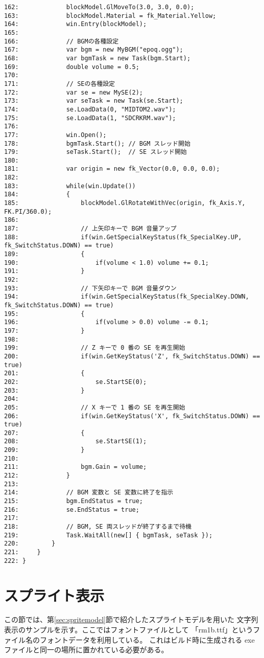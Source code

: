 \begin{breakbox}
\begin{small}
\begin{verbatim}
162:             blockModel.GlMoveTo(3.0, 3.0, 0.0);
163:             blockModel.Material = fk_Material.Yellow;
164:             win.Entry(blockModel);
165: 
166:             // BGMの各種設定
167:             var bgm = new MyBGM("epoq.ogg");
168:             var bgmTask = new Task(bgm.Start);
169:             double volume = 0.5;
170:             
171:             // SEの各種設定
172:             var se = new MySE(2);
173:             var seTask = new Task(se.Start);
174:             se.LoadData(0, "MIDTOM2.wav");
175:             se.LoadData(1, "SDCRKRM.wav");
176: 
177:             win.Open();
178:             bgmTask.Start(); // BGM スレッド開始
179:             seTask.Start();  // SE スレッド開始
180: 
181:             var origin = new fk_Vector(0.0, 0.0, 0.0);
182: 
183:             while(win.Update())
184:             {
185:                 blockModel.GlRotateWithVec(origin, fk_Axis.Y, FK.PI/360.0);
186: 
187:                 // 上矢印キーで BGM 音量アップ
188:                 if(win.GetSpecialKeyStatus(fk_SpecialKey.UP, fk_SwitchStatus.DOWN) == true)
189:                 {
190:                     if(volume < 1.0) volume += 0.1;
191:                 }
192: 
193:                 // 下矢印キーで BGM 音量ダウン
194:                 if(win.GetSpecialKeyStatus(fk_SpecialKey.DOWN, fk_SwitchStatus.DOWN) == true)
195:                 {
196:                     if(volume > 0.0) volume -= 0.1;
197:                 }
198: 
199:                 // Z キーで 0 番の SE を再生開始
200:                 if(win.GetKeyStatus('Z', fk_SwitchStatus.DOWN) == true)
201:                 {
202:                     se.StartSE(0);
203:                 }
204: 
205:                 // X キーで 1 番の SE を再生開始
206:                 if(win.GetKeyStatus('X', fk_SwitchStatus.DOWN) == true)
207:                 {
208:                     se.StartSE(1);
209:                 }
210: 
211:                 bgm.Gain = volume;
212:             }
213: 
214:             // BGM 変数と SE 変数に終了を指示
215:             bgm.EndStatus = true;
216:             se.EndStatus = true;
217: 
218:             // BGM, SE 両スレッドが終了するまで待機
219:             Task.WaitAll(new[] { bgmTask, seTask });
220:         }
221:     }
222: }
\end{verbatim}
\end{small}
\end{breakbox}

\section{スプライト表示}
この節では、第\ref{sec:spritemodel}節で紹介したスプライトモデルを用いた
文字列表示のサンプルを示す。ここではフォントファイルとして
「rm1b.ttf」というファイル名のフォントデータを利用している。
これはビルド時に生成される exe ファイルと同一の場所に置かれている必要がある。

